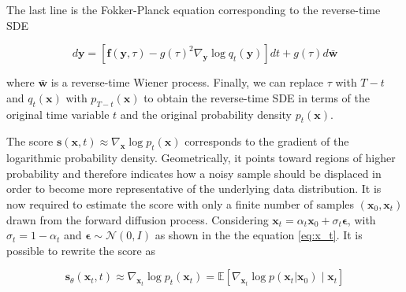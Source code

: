 \documentclass[11pt,a4paper]{article}
\begin{document}
\begin{compactproof}[title={Proof}]
The last line is the Fokker-Planck equation corresponding to the reverse-time SDE

\begin{equation*}
\boxed{
d\mathbf{y}
=
\left[
\mathbf{f}(\mathbf{y},\tau)
-
g(\tau)^2
\nabla_{\mathbf{y}}
\log q_t(\mathbf{y})
\right]dt
+
g(\tau)d\bar{\mathbf{w}}
}
\end{equation*}

where $\bar{\mathbf{w}}$ is a reverse-time Wiener process. Finally, we can replace $\tau$ with $T-t$ and $q_t(\mathbf{x})$ with $p_{T-t}(\mathbf{x})$ to obtain the reverse-time SDE in terms of the original time variable $t$ and the original probability density $p_t(\mathbf{x})$.     

\end{compactproof}

The score $\mathbf{s}(\mathbf{x},t) \approx \nabla_{\mathbf{x}}\log p_t(\mathbf{x})$ corresponds to the gradient of the logarithmic probability density. Geometrically, it points toward regions of higher probability and therefore indicates how a noisy sample should be displaced in order to become more representative of the underlying data distribution. It is now required to estimate the score with only a finite number of samples $(\mathbf{x}_{0},\mathbf{x}_{t})$ drawn from the forward diffusion process. Considering $\mathbf{x}_{t} = \alpha_{t}\mathbf{x}_{0} + \sigma_{t}\boldsymbol{\epsilon}$, with $\sigma_{t}=1-\alpha_{t}$ and $\boldsymbol{\epsilon} \sim \mathcal{N}(0, I)$ as shown in the the equation \ref{eq:x_t}. It is possible to rewrite the score as

\begin{equation}
    \mathbf{s}_{\theta}(\mathbf{x}_t,t)
    \approx
    \nabla_{\mathbf{x}_t}\log p_t(\mathbf{x}_t)
    =
    \mathbb{E}[
        \nabla_{\mathbf{x}_t}\log p(\mathbf{x}_t|\mathbf{x}_0)
        \mid
        \mathbf{x}_t
    ]
\end{equation}
\end{document}
